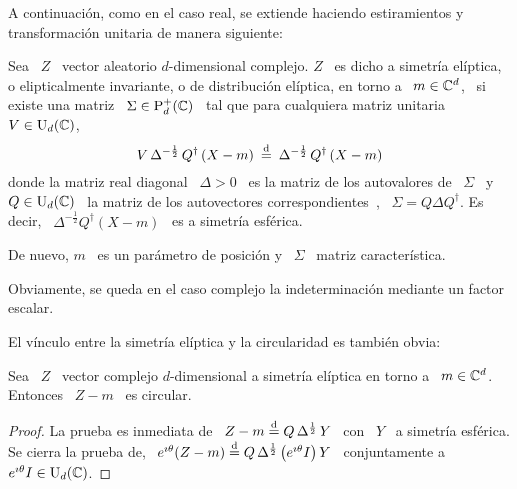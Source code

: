 A continuaci\'on,  como en  el caso real,  se extiende haciendo  estiramientos y
transformaci\'on unitaria de manera siguiente:
%
\begin{definicion}
\label{Def:MP:ElipticoComplejo}
%
  Sea  \ $Z$  \ vector  aleatorio $d$-dimensional  complejo.  $Z$  \ es  dicho a
  simetr\'ia  el\'iptica,  o  elipticalmente  invariante,  o  de  distribuci\'on
  el\'iptica, en torno a \ $m \in \mathbb{C}^d$, \ si existe una matriz \ $\Sigma \in
  \mathrm{P}_d^+(\mathbb{C})$  \  tal   que  para  cualquiera  matriz  unitaria   \  $V  \in
  \mathrm{U}_d(\mathbb{C})$,
  \[
  V  \,  \Delta^{-\frac12}  \,  Q^\dag  \left(  X  -  m  \right)  \:  \stackrel{\mathrm{d}}{=}  \:
  \Delta^{-\frac12} \, Q^\dag \left( X - m \right)
  \]
  donde la matriz real diagonal \ $\Delta > 0$ \ es la matriz de los autovalores
  de \  $\Sigma$ \ y \  $Q \in \mathrm{U}_d(\mathbb{C})$  \ la matriz de  los autovectores
  correspondientes~\cite{Bha97,   Bha07,  HorJoh13},  \   $\Sigma  =   Q  \Delta
  Q^\dag$. Es  decir, \ $\Delta^{-\frac12} Q^\dag \left(  X - m \right)$  \ es a
  simetr\'ia esf\'erica.

  De  nuevo, $m$  \  es  un par\'ametro  de  posici\'on y  \  $\Sigma$ \  matriz
  caracter\'istica.
\end{definicion}
%
Obviamente, se queda en el caso complejo la indeterminaci\'on mediante un factor
escalar.

El v\'inculo entre la simetr\'ia el\'iptica y la circularidad es tambi\'en obvia:
%
\begin{lema}
  Sea \ $Z$ \ vector complejo $d$-dimensional a simetr\'ia el\'iptica en torno a
  \ $m \in \mathbb{C}^d$. Entonces \ $Z-m$ \ es circular.
\end{lema}
%
\begin{proof}
  La prueba es  inmediata de \ $Z-m \stackrel{\mathrm{d}}{=}  Q \, \Delta^{\frac12} \, Y$  \ con \
  $Y$ \  a simetr\'ia esf\'erica. Se  cierra la prueba de,  \ $e^{\imath \theta}
  (Z-m) \stackrel{\mathrm{d}}{=} Q \, \Delta^{\frac12} \,  \big( e^{\imath \theta} I \big) \, Y$ \
  conjuntamente a \ $e^{\imath \theta} I \in \mathrm{U}_d(\mathbb{C})$.
\end{proof}

